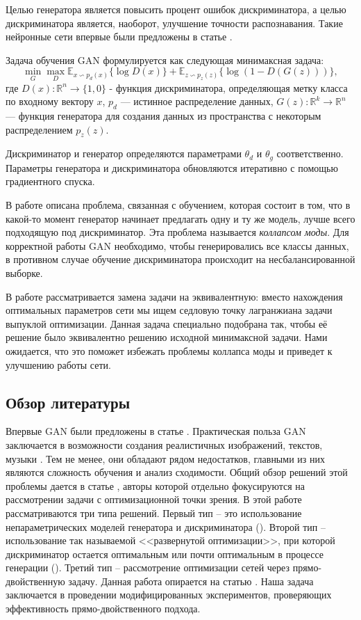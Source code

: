\documentclass[preprint,12pt]{elsarticle}
\def\EE{\mathbb E}
\def\RR{\mathbb R}
\begin{document}
Целью генератора является повысить процент ошибок дискриминатора, а целью дискриминатора является, наоборот, улучшение точности распознавания.
Такие нейронные сети впервые были предложены в статье \cite{goodfellow2014generative}.

Задача обучения GAN  формулируется как следующая минимаксная задача:
\begin{equation}
\min _G \max _D \EE _{x \backsim p_{d}(x) } \{ \log D(x) \}+ \EE _{z \backsim p_{z}(z)} \{ \log (1 - D(G(z))) \} ,
\end{equation}
где $D(x): \RR ^n \rightarrow \{1, 0 \}$ - функция дискриминатора, определяющая метку класса по входному вектору  $x$, $p_d$ — истинное распределение данных, $G(z): \RR ^ k \rightarrow \RR ^n $ — функция генератора для создания данных из пространства с некоторым распределением $ p_z(z)$.

Дискриминатор и генератор определяются параметрами $\theta _d$ и $\theta _g$ соответственно. 
Параметры генератора и дискриминатора обновляются итеративно с помощью градиентного спуска. 

В работе \cite{lu2018understand} описана проблема, связанная с обучением, которая состоит в том, что в какой-то момент генератор начинает предлагать одну и ту же модель, лучше всего подходящую под дискриминатор. Эта проблема называется \textit{коллапсом моды}. Для корректной работы GAN необходимо, чтобы генерировались все классы данных, в противном случае обучение дискриминатора происходит на несбалансированной выборке. 

В работе рассматривается замена задачи на эквивалентную: вместо нахождения оптимальных параметров сети мы ищем седловую точку лагранжиана задачи выпуклой оптимизации. Данная задача специально подобрана так, чтобы её решение было эквивалентно решению исходной минимаксной задачи. Нами ожидается, что это поможет избежать проблемы коллапса моды и приведет к улучшению работы сети.

\subsection{Обзор литературы}

Впервые GAN были предложены в статье \cite{goodfellow2014generative}. Практическая польза GAN заключается в возможности создания реалистичных изображений, текстов, музыки \cite{engel2019audio}. Тем не менее, они обладают рядом недостатков, главными из них являются сложность обучения и анализ сходимости. Общий обзор решений этой проблемы дается в статье \cite{lu2018understand}, авторы которой отдельно фокусируются на рассмотрении задачи с оптимизационной точки зрения. В этой работе рассматриваются три типа решений. Первый тип -- это использование непараметрических моделей генератора и дискриминатора (\cite{arjovsky2017wasserstein}). Второй тип -- 
использование так называемой <<развернутой оптимизации>>, при которой дискриминатор остается оптимальным или почти оптимальным в процессе генерации (\cite{metz2017unrolled}). Третий тип -- рассмотрение оптимизации сетей через прямо-двойственную задачу. Данная работа опирается на статью \cite{chen2018training}.
Наша задача заключается в проведении модифицированных  экспериментов, проверяющих эффективность прямо-двойственного подхода.
\end{document}
